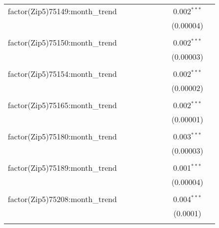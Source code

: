 \begin{table}[H]
{\begin{tabular}{@{\extracolsep{5pt}}lcccccccc}
  factor(Zip5)75149:month\_trend &  &  &  &  &  &  & 0.002$^{***}$ &  \\  

   &  &  &  &  &  &  & (0.00004) &  \\  

   & & & & & & & & \\  

  factor(Zip5)75150:month\_trend &  &  &  &  &  &  & 0.002$^{***}$ &  \\  

   &  &  &  &  &  &  & (0.00003) &  \\  

   & & & & & & & & \\  

  factor(Zip5)75154:month\_trend &  &  &  &  &  &  & 0.002$^{***}$ &  \\  

   &  &  &  &  &  &  & (0.00002) &  \\  

   & & & & & & & & \\  

  factor(Zip5)75165:month\_trend &  &  &  &  &  &  & 0.002$^{***}$ &  \\  

   &  &  &  &  &  &  & (0.00001) &  \\  

   & & & & & & & & \\  

  factor(Zip5)75180:month\_trend &  &  &  &  &  &  & 0.003$^{***}$ &  \\  

   &  &  &  &  &  &  & (0.00003) &  \\  

   & & & & & & & & \\  

  factor(Zip5)75189:month\_trend &  &  &  &  &  &  & 0.001$^{***}$ &  \\  

   &  &  &  &  &  &  & (0.00004) &  \\  

   & & & & & & & & \\  

  factor(Zip5)75208:month\_trend &  &  &  &  &  &  & 0.004$^{***}$ &  \\  

   &  &  &  &  &  &  & (0.0001) &  \\  

   & & & & & & & & \\  


\end{tabular}}
\end{table}
